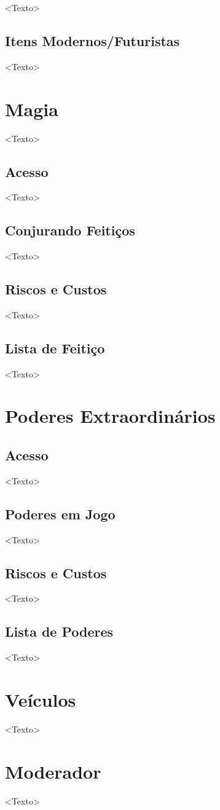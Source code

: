 \documentclass[a4paper, twocolumn, 10pt]{book}
\begin{document}
<Texto>

\section{Itens Modernos/Futuristas}

<Texto>

\chapter{Magia}

<Texto>

\section{Acesso}

<Texto>

\section{Conjurando Feitiços}

<Texto>

\section{Riscos e Custos}

<Texto>

\section{Lista de Feitiço}

<Texto>

\chapter{Poderes Extraordinários}

\section{Acesso}

<Texto>

\section{Poderes em Jogo}

<Texto>

\section{Riscos e Custos}

<Texto>

\section{Lista de Poderes}

<Texto>

\chapter{Veículos}

<Texto>

\chapter{Moderador}

<Texto>
\end{document}
